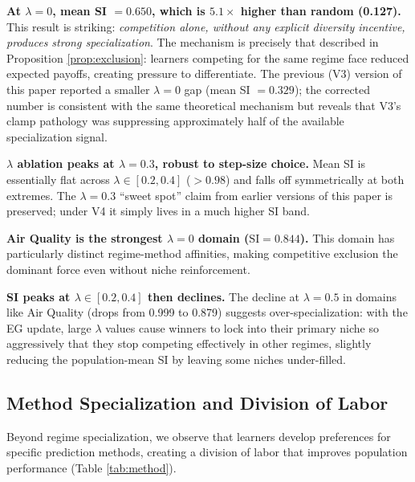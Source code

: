 \documentclass{article}
\begin{document}
\textbf{At $\lambda = 0$, mean SI $= 0.650$, which is $5.1\times$ higher than random (0.127).} This result is striking: \emph{competition alone, without any explicit diversity incentive, produces strong specialization}. The mechanism is precisely that described in Proposition \ref{prop:exclusion}: learners competing for the same regime face reduced expected payoffs, creating pressure to differentiate. The previous (V3) version of this paper reported a smaller $\lambda = 0$ gap (mean SI $= 0.329$); the corrected number is consistent with the same theoretical mechanism but reveals that V3's clamp pathology was suppressing approximately half of the available specialization signal.

\textbf{$\lambda$ ablation peaks at $\lambda = 0.3$, robust to step-size choice.} Mean SI is essentially flat across $\lambda \in [0.2, 0.4]$ ($> 0.98$) and falls off symmetrically at both extremes. The $\lambda = 0.3$ ``sweet spot'' claim from earlier versions of this paper is preserved; under V4 it simply lives in a much higher SI band.

\textbf{Air Quality is the strongest $\lambda = 0$ domain ($\mathrm{SI} = 0.844$).} This domain has particularly distinct regime-method affinities, making competitive exclusion the dominant force even without niche reinforcement.

\textbf{SI peaks at $\lambda \in [0.2, 0.4]$ then declines.} The decline at $\lambda = 0.5$ in domains like Air Quality (drops from 0.999 to 0.879) suggests over-specialization: with the EG update, large $\lambda$ values cause winners to lock into their primary niche so aggressively that they stop competing effectively in other regimes, slightly reducing the population-mean SI by leaving some niches under-filled.

\subsection{Method Specialization and Division of Labor}

Beyond regime specialization, we observe that learners develop preferences for specific prediction methods, creating a division of labor that improves population performance (Table \ref{tab:method}).
\end{document}

